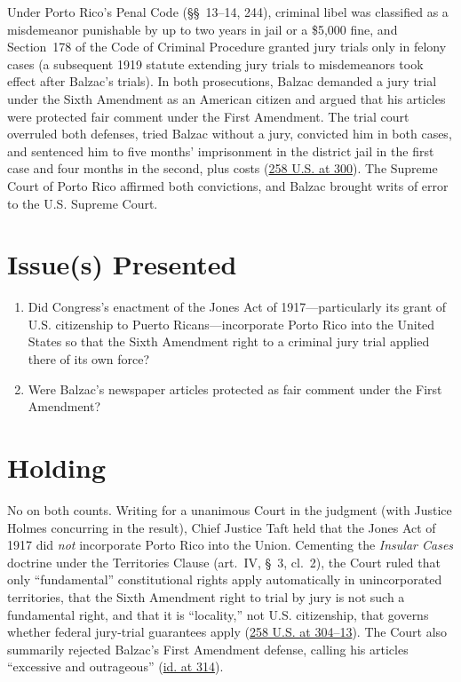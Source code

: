 \documentclass[12pt]{article}
\begin{document}
Under Porto Rico's Penal Code (\S\S~13--14, 244), criminal libel was classified as a misdemeanor punishable by up to two years in jail or a \$5,000 fine, and Section~178 of the Code of Criminal Procedure granted jury trials only in felony cases (a subsequent 1919 statute extending jury trials to misdemeanors took effect after Balzac's trials). In both prosecutions, Balzac demanded a jury trial under the Sixth Amendment as an American citizen and argued that his articles were protected fair comment under the First Amendment. The trial court overruled both defenses, tried Balzac without a jury, convicted him in both cases, and sentenced him to five months' imprisonment in the district jail in the first case and four months in the second, plus costs (\href{https://en.wikisource.org/wiki/Balzac_v._Porto_Rico/Opinion_of_the_Court}{258 U.S. at 300}). The Supreme Court of Porto Rico affirmed both convictions, and Balzac brought writs of error to the U.S. Supreme Court.

\section{Issue(s) Presented}
\begin{enumerate}
  \item Did Congress's enactment of the Jones Act of 1917---particularly its grant of U.S. citizenship to Puerto Ricans---incorporate Porto Rico into the United States so that the Sixth Amendment right to a criminal jury trial applied there of its own force?
  \item Were Balzac's newspaper articles protected as fair comment under the First Amendment?
\end{enumerate}

\section{Holding}
No on both counts. Writing for a unanimous Court in the judgment (with Justice Holmes concurring in the result), Chief Justice Taft held that the Jones Act of 1917 did \textit{not} incorporate Porto Rico into the Union. Cementing the \textit{Insular Cases} doctrine under the Territories Clause (art.~IV, \S~3, cl.~2), the Court ruled that only ``fundamental'' constitutional rights apply automatically in unincorporated territories, that the Sixth Amendment right to trial by jury is not such a fundamental right, and that it is ``locality,'' not U.S. citizenship, that governs whether federal jury-trial guarantees apply (\href{https://supreme.justia.com/cases/federal/us/258/298/}{258 U.S. at 304--13}). The Court also summarily rejected Balzac's First Amendment defense, calling his articles ``excessive and outrageous'' (\href{https://supreme.justia.com/cases/federal/us/258/298/}{id. at 314}).
\end{document}
